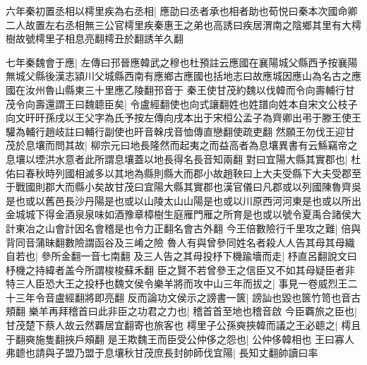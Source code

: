 六年秦初置丞相以樗里疾為右丞相|{
	應劭曰丞者承也相者助也荀悦曰秦本次國命卿二人故置左右丞相無三公官樗里疾秦惠王之弟也高誘曰疾居渭南之陰鄉其里有大樗樹故號樗里子相息亮翻樗丑於翻誘羊久翻
	}


七年秦魏會于應|{
	左傳曰邘晉應韓武之穆也杜預註云應國在襄陽城父縣西予按襄陽無城父縣後漢志潁川父城縣西南有應鄉古應國也括地志曰故應城因應山為名古之應國在汝州魯山縣東三十里應乙陵翻邘音于
	}
秦王使甘茂約魏以伐韓而令向壽輔行甘茂令向壽還謂王曰魏聼臣矣|{
	令盧經翻使也向式讓翻姓也姓譜向姓本自宋文公枝子向文旰旰孫戌以王父字為氏予按左傳向戌本出于宋桓公孟子為齊卿出弔于滕王使王驩為輔行趙岐註曰輔行副使也旰音榦戌音恤傳直戀翻使疏吏翻
	}
然願王勿伐王迎甘茂於息壤而問其故|{
	柳宗元曰地長隆然而起夷之而益高者為息壤異書有云鯀竊帝之息壤以堙洪水意者此所謂息壤蓋以地長得名長音知兩翻
	}
對曰宜陽大縣其實郡也|{
	杜佑曰春秋時列國相滅多以其地為縣則縣大而郡小故趙鞅曰上大夫受縣下大夫受郡至于戰國則郡大而縣小矣故甘茂曰宜陽大縣其實郡也漢官儀曰凡郡或以列國陳魯齊吳是也或以舊邑長沙丹陽是也或以山陵太山山陽是也或以川原西河河東是也或以所出金城城下得金酒泉泉味如酒豫章樟樹生庭雁門雁之所育是也或以號令夏禹合諸侯大計東冶之山會計因名會稽是也令力正翻名會古外翻
	}
今王倍數險行千里攻之難|{
	倍與背同音蒲昧翻數險謂函谷及三崤之險
	}
魯人有與曾參同姓名者殺人人告其母其母織自若也|{
	參所金翻一音七南翻
	}
及三人告之其母投杼下機踰墻而走|{
	杼直呂翻說文曰杼機之持緯者盖今所謂梭梭蘇禾翻
	}
臣之賢不若曾參王之信臣又不如其母疑臣者非特三人臣恐大王之投杼也魏文侯令樂羊將而攻中山三年而拔之|{
	事見一卷威烈王二十三年令音盧經翻將即亮翻
	}
反而論功文侯示之謗書一篋|{
	謗訕也毀也篋竹笥也音古頬翻
	}
樂羊再拜稽首曰此非臣之功君之力也|{
	稽首首至地也稽音啟
	}
今臣覉旅之臣也|{
	甘茂楚下蔡人故云然覉居宜翻寄也旅客也
	}
樗里子公孫奭挾韓而議之王必聼之|{
	樗且于翻奭施隻翻挾戶頰翻
	}
是王欺魏王而臣受公仲侈之怨也|{
	公仲侈韓相也
	}
王曰寡人弗聼也請與子盟乃盟于息壤秋甘茂庶長封帥師伐宜陽|{
	長知丈翻帥讀曰率
	}


